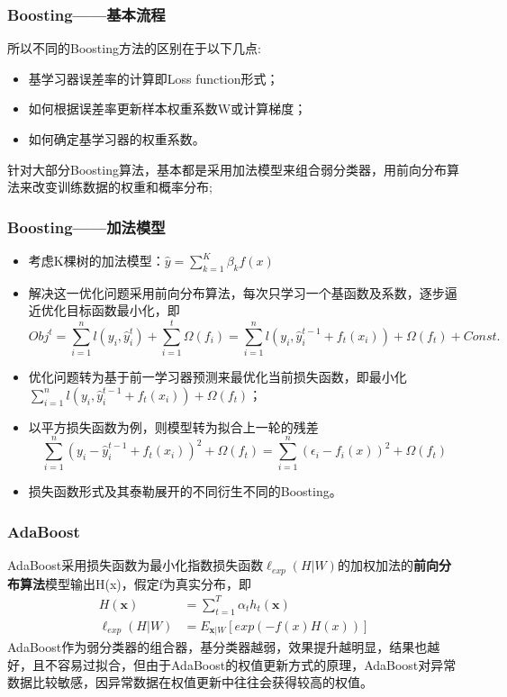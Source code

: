 \documentclass[usenames,dvipsnames]{beamer}
\begin{document}
\begin{frame}
\frametitle{Boosting——基本流程}
所以不同的Boosting方法的区别在于以下几点:\vskip 0.36cm
\begin{itemize}
  \item 基学习器误差率的计算即Loss function形式；
  \item 如何根据误差率更新样本权重系数W或计算梯度；
  \item 如何确定基学习器的权重系数。
\end{itemize}
\vskip 0.36cm
针对大部分Boosting算法，基本都是采用加法模型来组合弱分类器，用前向分布算法来改变训练数据的权重和概率分布;
\end{frame}
\begin{frame}
\frametitle{Boosting——加法模型}
\begin{itemize}
  \item 考虑K棵树的加法模型：$\hat{y} = \sum_{k=1}^{K}\beta_{k}f(x)$
  \item 解决这一优化问题采用前向分布算法，每次只学习一个基函数及系数，逐步逼近优化目标函数最小化，即
  $$Obj^{t} = \sum_{i=1}^{n}l(y_i, \hat{y}_i^t)+\sum_{i=1}^{t}\Omega(f_i) = \sum_{i=1}^{n}l(y_i, \hat{y}_{i}^{t-1}+f_t(x_i))+\Omega(f_t)+Const.$$
  \item 优化问题转为基于前一学习器预测来最优化当前损失函数，即最小化$\sum_{i=1}^{n}l(y_i, \hat{y}_{i}^{t-1}+f_t(x_i))+\Omega(f_t)$；
  \item 以平方损失函数为例，则模型转为拟合上一轮的残差$$\sum_{i=1}^{n}(y_i-\hat{y}_{i}^{t-1}+f_t(x_i))^2+\Omega(f_t) = \sum_{i=1}^{n}(\epsilon_i - f_i(x))^2 + \Omega(f_t)$$
  \item 损失函数形式及其泰勒展开的不同衍生不同的Boosting。
\end{itemize}
\end{frame}
\begin{frame}
\frametitle{AdaBoost}
AdaBoost采用损失函数为最小化指数损失函数$\ell_{exp}(H|W)$的加权加法的\textbf{前向分布算法}模型输出H(x)，假定f为真实分布，即
\begin{align*}
  H(\textbf{x}) & = \sum_{t=1}^{T}\alpha_th_t(\textbf{x})\\
    \ell_{exp}(H|W)& = E_{\textbf{x}|W}[exp(-f(x)H(x))]
\end{align*}
AdaBoost作为弱分类器的组合器，基分类器越弱，效果提升越明显，结果也越好，且不容易过拟合，但由于AdaBoost的权值更新方式的原理，AdaBoost对异常数据比较敏感，因异常数据在权值更新中往往会获得较高的权值。
\end{frame}
\end{document}
